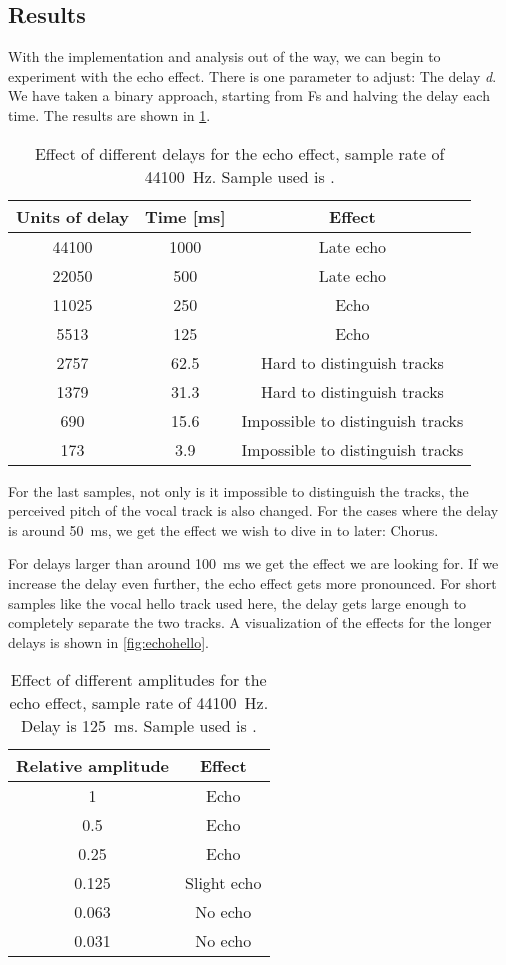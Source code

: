 
\subsection{Results}
With the implementation and analysis out of the way, we can begin to experiment with the echo effect. There is one parameter to adjust: The delay \emph{d}. We have taken a binary approach, starting from Fs and halving the delay each time. The results are shown in \cref{tbl:echo}.
\begin{table}[!hbt]
	\centering
	\begin{tabular}{ccc}
		\toprule
		Units of delay & Time [ms] & Effect \\ 
		\midrule
		44100 & 1000 & Late echo \\ 
		22050 & 500 & Late echo \\ 
		11025 & 250 & Echo \\ 
		5513 & 125 & Echo \\ 
		2757 & 62.5 & Hard to distinguish tracks \\ 
		1379 & 31.3 & Hard to distinguish tracks \\ 
		690 & 15.6 & Impossible to distinguish tracks \\ 
		173 & 3.9 & Impossible to distinguish tracks \\ 
		\bottomrule
	\end{tabular}
	\caption{Effect of different delays for the echo effect, sample rate of \SI{44100}{\hertz}. Sample used is \cite{audiohello}.}
	\label{tbl:echo}
\end{table}
For the last samples, not only is it impossible to distinguish the tracks, the perceived pitch of the vocal track is also changed. For the cases where the delay is around \SI{50}{\milli\second}, we get the effect we wish to dive in to later: Chorus.

For delays larger than around \SI{100}{\milli\second} we get the effect we are looking for. If we increase the delay even further, the echo effect gets more pronounced. For short samples like the vocal hello track used here, the delay gets large enough to completely separate the two tracks. A visualization of the effects for the longer delays is shown in \cref{fig:echohello}.

\begin{table}[!hbt]
	\centering
	\begin{tabular}{cc}
		\toprule
		Relative amplitude & Effect \\ 
		\midrule
		1 & Echo \\ 
		0.5 & Echo \\ 
		0.25 & Echo \\ 
		0.125 & Slight echo \\ 
		0.063 & No echo \\ 
		0.031 & No echo \\ 
		\bottomrule
	\end{tabular}
	\caption{Effect of different amplitudes for the echo effect, sample rate of \SI{44100}{\hertz}. Delay is \SI{125}{\milli\second}. Sample used is \cite{audiohello}.}
	\label{tbl:echoamp}
\end{table}

